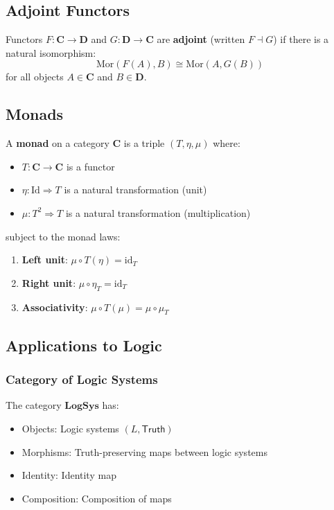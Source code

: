 \subsection{Adjoint Functors}

\begin{definition}
Functors $F: \mathbf{C} \to \mathbf{D}$ and $G: \mathbf{D} \to \mathbf{C}$ are \textbf{adjoint} (written $F \dashv G$) if there is a natural isomorphism:
$$\text{Mor}(F(A), B) \cong \text{Mor}(A, G(B))$$
for all objects $A \in \mathbf{C}$ and $B \in \mathbf{D}$.
\end{definition}

\subsection{Monads}

\begin{definition}[Monad]
A \textbf{monad} on a category $\mathbf{C}$ is a triple $(T, \eta, \mu)$ where:
\begin{itemize}
\item $T: \mathbf{C} \to \mathbf{C}$ is a functor
\item $\eta: \text{Id} \Rightarrow T$ is a natural transformation (unit)
\item $\mu: T^2 \Rightarrow T$ is a natural transformation (multiplication)
\end{itemize}
subject to the monad laws:
\begin{enumerate}
\item \textbf{Left unit}: $\mu \circ T(\eta) = \text{id}_T$
\item \textbf{Right unit}: $\mu \circ \eta_T = \text{id}_T$
\item \textbf{Associativity}: $\mu \circ T(\mu) = \mu \circ \mu_T$
\end{enumerate}
\end{definition}

\subsection{Applications to Logic}

\subsubsection{Category of Logic Systems}

\begin{definition}
The category $\mathbf{LogSys}$ has:
\begin{itemize}
\item Objects: Logic systems $(L, \mathsf{Truth})$
\item Morphisms: Truth-preserving maps between logic systems
\item Identity: Identity map
\item Composition: Composition of maps
\end{itemize}
\end{definition}

